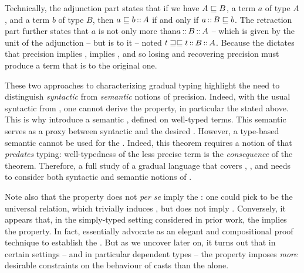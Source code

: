 Technically, the adjunction part states that if we have $A \sqsubseteq B$, a term $a$ of type $A$,
and a term $b$ of type $B$, then $a \sqsubseteq b \operatorname{\mathord{:}:} A$ if and only if $a \operatorname{\mathord{:}:} B \sqsubseteq b$.
%
\AP The retraction part further states that $a$ is not only more 
than$a \operatorname{\mathord{:}:} B \operatorname{\mathord{:}:} A$ – which is given by the unit of the adjunction –
but is  to it – noted $t \sqsupseteq\sqsubseteq t \operatorname{\mathord{:}:} B \operatorname{\mathord{:}:} A$.
Because the  dictates that precision implies ,
 implies ,
and so losing and recovering precision must produce a term that is  to the original one.

These two approaches to characterizing gradual typing highlight
the need to distinguish
\emph{syntactic} from \emph{semantic} notions of precision.
Indeed, with the usual syntactic  from ,
one cannot derive the  property, in particular the  stated above.
This is why  introduce a semantic ,
defined on well-typed terms. This semantic  serves
as a proxy between syntactic  and the desired
.
%
However, a type-based semantic  cannot be used for the .
Indeed, this theorem%
requires a notion of  that \emph{predates} typing:
well-typedness of the less precise term is the \emph{consequence} of the theorem. 
Therefore, a full study of a gradual language that covers , , and
 needs to consider both syntactic and semantic
notions of .

Note also that the  property does not
\textit{per se} imply the : one could pick  to be the universal relation,
which trivially induces , but does not imply .
Conversely, it appears that, in the simply-typed setting considered in prior work,
the  implies the  property.
In fact, \textcite{New2018} essentially advocate  as an elegant and compositional
proof technique to establish the .
But as we uncover later on, it turns out that in certain settings – and in particular dependent types – the  property imposes \emph{more}
desirable constraints on the behaviour of casts than the  alone.

